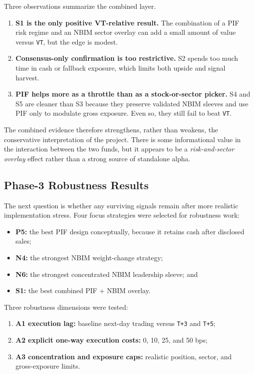\documentclass[conference]{IEEEtran}
\begin{document}
Three observations summarize the combined layer.
\begin{enumerate}[leftmargin=1.4em]
    \item \textbf{S1 is the only positive VT-relative result.} The combination of a PIF risk regime and an NBIM sector overlay can add a small amount of value versus \texttt{VT}, but the edge is modest.
    \item \textbf{Consensus-only confirmation is too restrictive.} S2 spends too much time in cash or fallback exposure, which limits both upside and signal harvest.
    \item \textbf{PIF helps more as a throttle than as a stock-or-sector picker.} S4 and S5 are cleaner than S3 because they preserve validated NBIM sleeves and use PIF only to modulate gross exposure. Even so, they still fail to beat \texttt{VT}.
\end{enumerate}

The combined evidence therefore strengthens, rather than weakens, the conservative interpretation of the project. There is some informational value in the interaction between the two funds, but it appears to be a \emph{risk-and-sector overlay} effect rather than a strong source of standalone alpha.

\subsection{Phase-3 Robustness Results}

The next question is whether any surviving signals remain after more realistic implementation stress. Four focus strategies were selected for robustness work:
\begin{itemize}[leftmargin=1.4em]
    \item \textbf{P5:} the best PIF design conceptually, because it retains cash after disclosed sales;
    \item \textbf{N4:} the strongest NBIM weight-change strategy;
    \item \textbf{N6:} the strongest concentrated NBIM leadership sleeve; and
    \item \textbf{S1:} the best combined PIF + NBIM overlay.
\end{itemize}

Three robustness dimensions were tested:
\begin{enumerate}[leftmargin=1.4em]
    \item \textbf{A1 execution lag:} baseline next-day trading versus \texttt{T+3} and \texttt{T+5};
    \item \textbf{A2 explicit one-way execution costs:} 0, 10, 25, and 50 bps;
    \item \textbf{A3 concentration and exposure caps:} realistic position, sector, and gross-exposure limits.
\end{enumerate}
\end{document}
